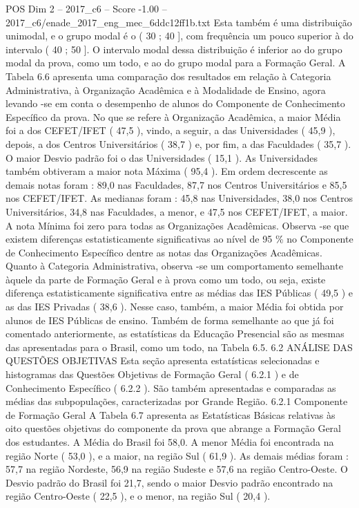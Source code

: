 \begin{textsample}{POS Dim 2 – 2017\_c6 – Score -1.00 – 2017\_c6/enade\_2017\_eng\_mec\_6ddc12ff1b.txt}
Esta também é uma distribuição unimodal, e o grupo modal é o ( 30 ; 40 ], com frequência um pouco superior à do intervalo ( 40 ; 50 ].
O intervalo modal dessa distribuição é inferior ao do grupo modal da prova, como um todo, e ao do grupo modal para a Formação Geral.
A Tabela 6.6 apresenta uma comparação dos resultados em relação à Categoria Administrativa, à Organização Acadêmica e à Modalidade de Ensino, agora levando -se em conta o desempenho de alunos do Componente de Conhecimento Específico da prova.
No que se refere à Organização Acadêmica, a maior Média foi a dos CEFET/IFET ( 47,5 ), vindo, a seguir, a das Universidades ( 45,9 ), depois, a dos Centros Universitários ( 38,7 ) e, por fim, a das Faculdades ( 35,7 ).
O maior Desvio padrão foi o das Universidades ( 15,1 ).
As Universidades também obtiveram a maior nota Máxima ( 95,4 ).
Em ordem decrescente as demais notas foram : 89,0 nas Faculdades, 87,7 nos Centros Universitários e 85,5 nos CEFET/IFET.
As medianas foram : 45,8 nas Universidades, 38,0 nos Centros Universitários, 34,8 nas Faculdades, a menor, e 47,5 nos CEFET/IFET, a maior.
A nota Mínima foi zero para todas as Organizações Acadêmicas.
Observa -se que existem diferenças estatisticamente significativas ao nível de 95 \% no Componente de Conhecimento Específico dentre as notas das Organizações Acadêmicas.
Quanto à Categoria Administrativa, observa -se um comportamento semelhante àquele da parte de Formação Geral e à prova como um todo, ou seja, existe diferença estatisticamente significativa entre as médias das IES Públicas ( 49,5 ) e as das IES Privadas ( 38,6 ).
Nesse caso, também, a maior Média foi obtida por alunos de IES Públicas de ensino.
Também de forma semelhante ao que já foi comentado anteriormente, as estatísticas da Educação Presencial são as mesmas das apresentadas para o Brasil, como um todo, na Tabela 6.5. 6.2 ANÁLISE DAS QUESTÕES OBJETIVAS Esta seção apresenta estatísticas selecionadas e histogramas das Questões Objetivas de Formação Geral ( 6.2.1 ) e de Conhecimento Específico ( 6.2.2 ).
São também apresentadas e comparadas as médias das subpopulações, caracterizadas por Grande Região. 6.2.1 Componente de Formação Geral A Tabela 6.7 apresenta as Estatísticas Básicas relativas às oito questões objetivas do componente da prova que abrange a Formação Geral dos estudantes.
A Média do Brasil foi 58,0.
A menor Média foi encontrada na região Norte ( 53,0 ), e a maior, na região Sul ( 61,9 ).
As demais médias foram : 57,7 na região Nordeste, 56,9 na região Sudeste e 57,6 na região Centro-Oeste.
O Desvio padrão do Brasil foi 21,7, sendo o maior Desvio padrão encontrado na região Centro-Oeste ( 22,5 ), e o menor, na região Sul ( 20,4 ).

\end{textsample}
